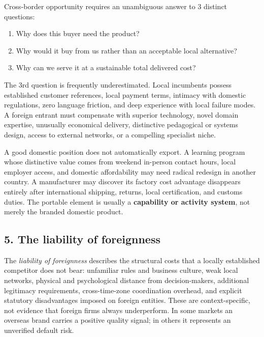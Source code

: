 Cross-border opportunity requires an unambiguous answer to 3 distinct questions:
\begin{enumerate}
    \item Why does this buyer need the product?
    \item Why would it buy from us rather than an acceptable local alternative?
    \item Why can we serve it at a sustainable total delivered cost?
\end{enumerate}

The 3rd question is frequently underestimated. Local incumbents possess established customer references, local payment terms, intimacy with domestic regulations, zero language friction, and deep experience with local failure modes. A foreign entrant must compensate with superior technology, novel domain expertise, unusually economical delivery, distinctive pedagogical or systems design, access to external networks, or a compelling specialist niche.

A good domestic position does not automatically export. A learning program whose distinctive value comes from weekend in-person contact hours, local employer access, and domestic affordability may need radical redesign in another country. A manufacturer may discover its factory cost advantage disappears entirely after international shipping, returns, local certification, and customs duties. The portable element is usually a \textbf{capability or activity system}, not merely the branded domestic product.

\subsection{5. The liability of foreignness}

The \textit{liability of foreignness} describes the structural costs that a locally established competitor does not bear: unfamiliar rules and business culture, weak local networks, physical and psychological distance from decision-makers, additional legitimacy requirements, cross-time-zone coordination overhead, and explicit statutory disadvantages imposed on foreign entities. These are context-specific, not evidence that foreign firms always underperform. In some markets an overseas brand carries a positive quality signal; in others it represents an unverified default risk.

